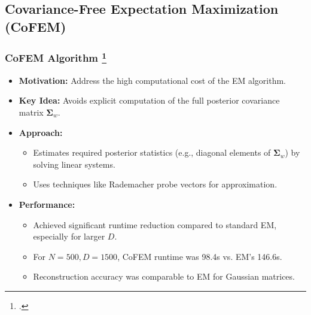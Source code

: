 \documentclass{beamer}
\begin{document}
\subsection{Covariance-Free Expectation Maximization (CoFEM)}
\begin{frame}
    \frametitle{CoFEM Algorithm \footcite{lin2022covariance}}
    \begin{itemize}
        \item \textbf{Motivation:} Address the high computational cost of the EM algorithm.
        \item \textbf{Key Idea:} Avoids explicit computation of the full posterior covariance matrix $\boldsymbol{\Sigma}_w$.
        \item \textbf{Approach:}
        \begin{itemize}
            \item Estimates required posterior statistics (e.g., diagonal elements of $\boldsymbol{\Sigma}_w$) by solving linear systems.
            \item Uses techniques like Rademacher probe vectors for approximation.
        \end{itemize}
        \item \textbf{Performance:}
        \begin{itemize}
            \item Achieved significant runtime reduction compared to standard EM, especially for larger $D$.
            \item For $N=500, D=1500$, CoFEM runtime was 98.4s vs. EM's 146.6s.
            \item Reconstruction accuracy was comparable to EM for Gaussian matrices.
        \end{itemize}
    \end{itemize}
\end{frame}
\end{document}
